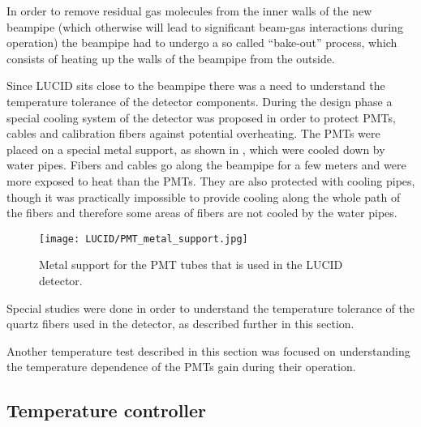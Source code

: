 In order to remove residual gas molecules from the inner walls of the new beampipe (which otherwise will lead to significant beam-gas interactions during operation)
the beampipe had to undergo a so called ``bake-out'' process, which consists of heating up the walls of the beampipe from the outside.

Since LUCID sits close to the beampipe there was a need to understand the temperature tolerance of the detector components.
During the design phase a special cooling system of the detector was proposed in order to protect PMTs, cables and calibration fibers against potential overheating.
The PMTs were placed on a special metal support, as shown in , which were cooled down by water pipes.
Fibers and cables go along the beampipe for a few meters and were more exposed to heat than the PMTs.
They are also protected with cooling pipes, though it was practically impossible to provide cooling along the whole path of the fibers 
and therefore some areas of fibers are not cooled by the water pipes.

\begin{figure}
\centering
\texttt{[image: LUCID/PMT\_metal\_support.jpg]}
\caption{Metal support for the PMT tubes that is used in the LUCID detector.}
\label{fig:metalSupport}
\end{figure}

Special studies were done in order to understand the temperature tolerance of the quartz fibers used in the detector, as described further in this section.


Another temperature test described in this section was focused on understanding the temperature dependence of the PMTs gain during their operation.

\subsection{Temperature controller}
\label{subsec:tempController}

